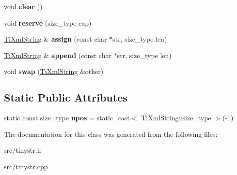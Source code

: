 \begin{DoxyCompactItemize}
\item 
void {\bfseries clear} ()\hypertarget{classTiXmlString_ab20e06e4c666abf3bdbfb3a1191d4888}{}\label{classTiXmlString_ab20e06e4c666abf3bdbfb3a1191d4888}

\item 
void {\bfseries reserve} (size\+\_\+type cap)\hypertarget{classTiXmlString_a88ecf9f0f00cb5c67b6b637958d7049c}{}\label{classTiXmlString_a88ecf9f0f00cb5c67b6b637958d7049c}

\item 
\hyperlink{classTiXmlString}{Ti\+Xml\+String} \& {\bfseries assign} (const char $\ast$str, size\+\_\+type len)\hypertarget{classTiXmlString_ac72f3d9149b7812c1e6c59402014d0d5}{}\label{classTiXmlString_ac72f3d9149b7812c1e6c59402014d0d5}

\item 
\hyperlink{classTiXmlString}{Ti\+Xml\+String} \& {\bfseries append} (const char $\ast$str, size\+\_\+type len)\hypertarget{classTiXmlString_ad44b21700d2ec24a511367b222b643fb}{}\label{classTiXmlString_ad44b21700d2ec24a511367b222b643fb}

\item 
void {\bfseries swap} (\hyperlink{classTiXmlString}{Ti\+Xml\+String} \&other)\hypertarget{classTiXmlString_aa392cbc180752a79f007f4f9280c7762}{}\label{classTiXmlString_aa392cbc180752a79f007f4f9280c7762}

\end{DoxyCompactItemize}
\subsection*{Static Public Attributes}
\begin{DoxyCompactItemize}
\item 
static const size\+\_\+type {\bfseries npos} = static\+\_\+cast$<$ Ti\+Xml\+String\+::size\+\_\+type $>$(-\/1)\hypertarget{classTiXmlString_a8f4422d227088dc7bec96f479b275d0a}{}\label{classTiXmlString_a8f4422d227088dc7bec96f479b275d0a}

\end{DoxyCompactItemize}


The documentation for this class was generated from the following files\+:\begin{DoxyCompactItemize}
\item 
src/tinystr.\+h\item 
src/tinystr.\+cpp\end{DoxyCompactItemize}
